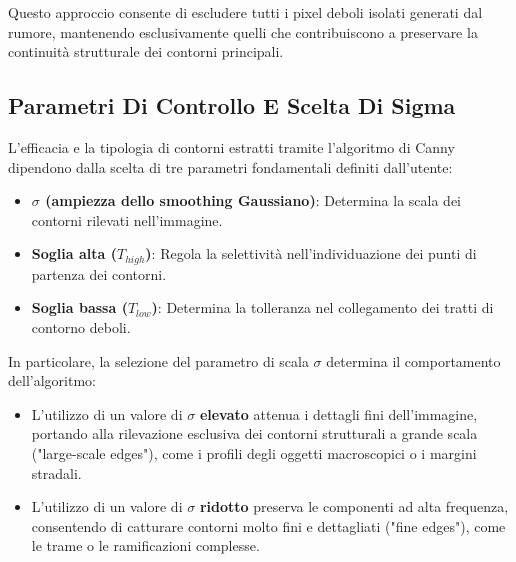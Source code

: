 ﻿\documentclass[11pt, a4paper]{article}
\begin{document}
Questo approccio consente di escludere tutti i pixel deboli isolati generati dal rumore, mantenendo esclusivamente quelli che contribuiscono a preservare la continuità strutturale dei contorni principali.


\subsection{Parametri Di Controllo E Scelta Di Sigma}

L'efficacia e la tipologia di contorni estratti tramite l'algoritmo di Canny dipendono dalla scelta di tre parametri fondamentali definiti dall'utente:
\begin{itemize}
    \item \textbf{$\sigma$ (ampiezza dello smoothing Gaussiano)}: Determina la scala dei contorni rilevati nell'immagine.
    \item \textbf{Soglia alta ($T_{high}$)}: Regola la selettività nell'individuazione dei punti di partenza dei contorni.
    \item \textbf{Soglia bassa ($T_{low}$)}: Determina la tolleranza nel collegamento dei tratti di contorno deboli.
\end{itemize}

In particolare, la selezione del parametro di scala $\sigma$ determina il comportamento dell'algoritmo:
\begin{itemize}
    \item L'utilizzo di un valore di $\sigma$ \textbf{elevato} attenua i dettagli fini dell'immagine, portando alla rilevazione esclusiva dei contorni strutturali a grande scala ("large-scale edges"), come i profili degli oggetti macroscopici o i margini stradali.
    \item L'utilizzo di un valore di $\sigma$ \textbf{ridotto} preserva le componenti ad alta frequenza, consentendo di catturare contorni molto fini e dettagliati ("fine edges"), come le trame o le ramificazioni complesse.
\end{itemize}

\end{document}
